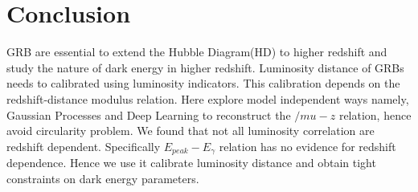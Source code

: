 \section{Conclusion}
\label{conclusion}
GRB are essential to extend the Hubble Diagram(HD) to higher redshift and study the nature of dark energy in higher redshift. Luminosity distance of GRBs needs to calibrated using luminosity indicators. This calibration depends on the redshift-distance modulus relation. Here explore model independent ways namely, Gaussian Processes and Deep Learning to reconstruct the $/mu-z$ relation, hence avoid circularity problem. We found that not all luminosity correlation are redshift dependent. Specifically $E_{peak}-E_{\gamma}$ relation has no evidence for redshift dependence. Hence we use it calibrate luminosity distance and obtain tight constraints on dark energy parameters.

